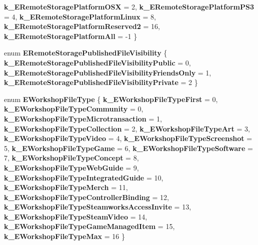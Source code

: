 \begin{DoxyCompactItemize}
{\bfseries k\+\_\+\+E\+Remote\+Storage\+Platform\+O\+SX} = 2, 
{\bfseries k\+\_\+\+E\+Remote\+Storage\+Platform\+P\+S3} = 4, 
\newline
{\bfseries k\+\_\+\+E\+Remote\+Storage\+Platform\+Linux} = 8, 
{\bfseries k\+\_\+\+E\+Remote\+Storage\+Platform\+Reserved2} = 16, 
{\bfseries k\+\_\+\+E\+Remote\+Storage\+Platform\+All} = -\/1
 \}
\item 
\mbox{\label{namespace_valve_1_1_steamworks_a2123a5b99513ae8397d240a720bac0ab}} 
enum {\bfseries E\+Remote\+Storage\+Published\+File\+Visibility} \{ {\bfseries k\+\_\+\+E\+Remote\+Storage\+Published\+File\+Visibility\+Public} = 0, 
{\bfseries k\+\_\+\+E\+Remote\+Storage\+Published\+File\+Visibility\+Friends\+Only} = 1, 
{\bfseries k\+\_\+\+E\+Remote\+Storage\+Published\+File\+Visibility\+Private} = 2
 \}
\item 
\mbox{\label{namespace_valve_1_1_steamworks_a5f0138cfef9f170b2e8bffb67f0ee201}} 
enum {\bfseries E\+Workshop\+File\+Type} \{ \newline
{\bfseries k\+\_\+\+E\+Workshop\+File\+Type\+First} = 0, 
{\bfseries k\+\_\+\+E\+Workshop\+File\+Type\+Community} = 0, 
{\bfseries k\+\_\+\+E\+Workshop\+File\+Type\+Microtransaction} = 1, 
{\bfseries k\+\_\+\+E\+Workshop\+File\+Type\+Collection} = 2, 
\newline
{\bfseries k\+\_\+\+E\+Workshop\+File\+Type\+Art} = 3, 
{\bfseries k\+\_\+\+E\+Workshop\+File\+Type\+Video} = 4, 
{\bfseries k\+\_\+\+E\+Workshop\+File\+Type\+Screenshot} = 5, 
{\bfseries k\+\_\+\+E\+Workshop\+File\+Type\+Game} = 6, 
\newline
{\bfseries k\+\_\+\+E\+Workshop\+File\+Type\+Software} = 7, 
{\bfseries k\+\_\+\+E\+Workshop\+File\+Type\+Concept} = 8, 
{\bfseries k\+\_\+\+E\+Workshop\+File\+Type\+Web\+Guide} = 9, 
{\bfseries k\+\_\+\+E\+Workshop\+File\+Type\+Integrated\+Guide} = 10, 
\newline
{\bfseries k\+\_\+\+E\+Workshop\+File\+Type\+Merch} = 11, 
{\bfseries k\+\_\+\+E\+Workshop\+File\+Type\+Controller\+Binding} = 12, 
{\bfseries k\+\_\+\+E\+Workshop\+File\+Type\+Steamworks\+Access\+Invite} = 13, 
{\bfseries k\+\_\+\+E\+Workshop\+File\+Type\+Steam\+Video} = 14, 
\newline
{\bfseries k\+\_\+\+E\+Workshop\+File\+Type\+Game\+Managed\+Item} = 15, 
{\bfseries k\+\_\+\+E\+Workshop\+File\+Type\+Max} = 16
 \}
\item 
\mbox{\label{namespace_valve_1_1_steamworks_ae8de283456646edfb6275a197cda10c4}} 

\end{DoxyCompactItemize}
